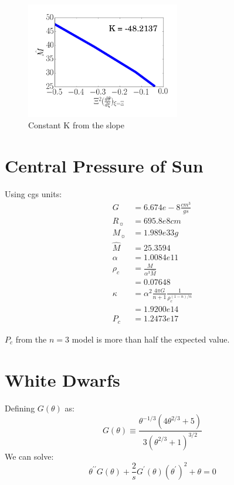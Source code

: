 \documentclass[12pt]{article}
\begin{document}
  \begin{figure}[h!]
    \centering
    \includegraphics[width=0.6\textwidth]{K.png}
    \caption{Constant K from the slope}
  \end{figure}
 
  \clearpage 
  \section{Central Pressure of Sun}

  Using cgs units:
  \begin{align}
    G       &= 6.674e-8 \frac{cm^3}{g s} \nonumber  \\
    R_\sun  &= 695.8e8  cm \nonumber \\
    M_\sun  &= 1.989e33 g  \nonumber \\
    \hat{M} &= 25.3594   \nonumber \\
    \alpha  &= 1.0084e11 \nonumber \\
    \rho_c  &= \frac{M}{\alpha^3\hat{M}} \nonumber \\
            &= 0.07648    \nonumber \\
    \kappa  &= \alpha ^2\frac{4\pi G}{n+1}\frac{1}{\rho_c^{(1-n)/n}} \nonumber \\
            &= 1.9200e14  \nonumber \\
    P_c     &= 1.2473e17  \nonumber
  \end{align}

  $P_c$ from the $n=3$ model is more than half the expected value.

  \section{White Dwarfs}
  
  Defining $G(\theta)$ as:
  \begin{equation}
    G(\theta) \equiv \frac{\theta^{-1/3}(4\theta^{2/3}+5)}{3(\theta^{2/3}+1)^{3/2}} \nonumber
  \end{equation}
  We can solve:
  \begin{equation}
    \theta^{\prime\prime}G(\theta) + \frac{2}{s}G^\prime(\theta)(\theta^\prime)^2+\theta=0 \nonumber
  \end{equation}
\end{document}
